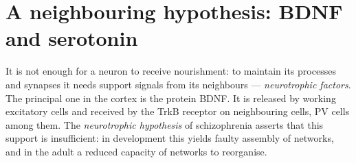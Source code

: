 \section{A neighbouring hypothesis: BDNF and serotonin}
It is not enough for a neuron to receive nourishment: to maintain its processes and synapses it needs support signals from its neighbours --- \emph{neurotrophic factors}. The principal one in the cortex is the protein BDNF. It is released by working excitatory cells and received by the TrkB receptor on neighbouring cells, PV cells among them. The \emph{neurotrophic hypothesis} of schizophrenia asserts that this support is insufficient: in development this yields faulty assembly of networks, and in the adult a reduced capacity of networks to reorganise.

